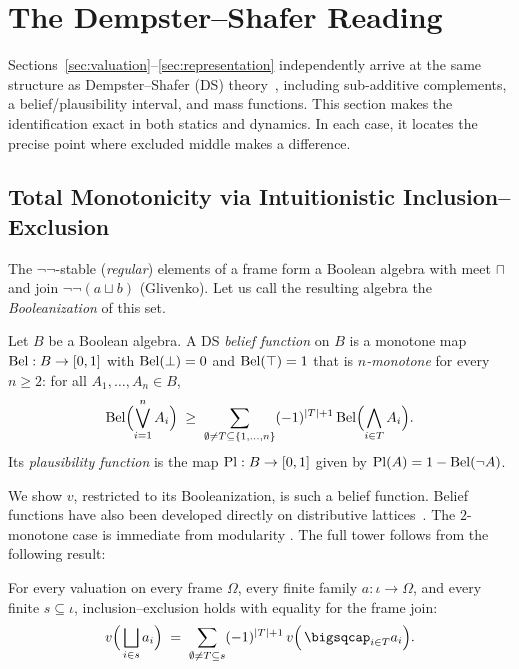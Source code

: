 \section{The Dempster--Shafer Reading}
\label{sec:ds}

Sections~\ref{sec:valuation}--\ref{sec:representation} independently
arrive at the same structure as Dempster--Shafer (DS)
theory~\cite{dempster1967,shafer1976}, including sub-additive complements, a
belief/plausibility interval, and mass functions.  
This section makes the identification exact in both statics and
dynamics.  In each case, it locates the precise point where excluded
middle makes a difference.

\subsection{Total Monotonicity via Intuitionistic
Inclusion--Exclusion}

The $\neg\neg$-stable (\emph{regular}) elements of a frame form a
Boolean algebra with meet $\sqcap$ and join
$\neg\neg(a \sqcup b)$ (Glivenko).  Let us call the resulting
algebra the
\emph{Booleanization} of this set.

\begin{definition}
\label{def:belief}
Let $B$ be a Boolean algebra.  A DS \emph{belief function} on $B$ is a
monotone map $\mathrm{Bel} : B \to [0,1]$ with $\mathrm{Bel}(\bot) = 0$ and
$\mathrm{Bel}(\top) = 1$ that is \emph{$n$-monotone} for
every $n \ge 2$: for all $A_1, \dots, A_n \in B$,
\[
  \mathrm{Bel}\Bigl(\bigvee_{i=1}^{n} A_i\Bigr) \;\ge\;
  \sum_{\emptyset \neq T \subseteq \{1,\dots,n\}} (-1)^{|T|+1}\,
  \mathrm{Bel}\Bigl(\bigwedge_{i \in T} A_i\Bigr).
\]
Its \emph{plausibility function} is the map $\mathrm{Pl} : B \to [0,1]$
given by $\mathrm{Pl}(A) = 1 - \mathrm{Bel}(\neg A)$.
\end{definition}

We show $v$, restricted
to its Booleanization, is such a belief function. Belief functions have
also been developed directly on distributive lattices~\cite{zhou2013}.  The
$2$-monotone case is immediate from modularity
.  The full tower follows from the following
result:

\begin{theorem}
\label{thm:incl-excl}
For every valuation on every frame $\Omega$, every finite family
$a : \iota \to \Omega$, and every finite $s \subseteq \iota$,
inclusion--exclusion holds with
equality for the frame join:
\[
  v\Bigl(\,\bigsqcup_{i \in s} a_i\Bigr)
  \;=\; \sum_{\emptyset \neq T \subseteq s} (-1)^{|T|+1}\,
        v\Bigl(\,\bigsqcap_{i \in T} a_i\Bigr).
\]
\end{theorem}

